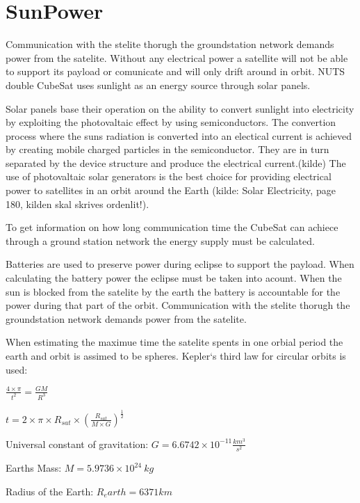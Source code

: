 \section{SunPower}

Communication with the stelite thorugh the groundstation network demands power from the satelite. Without any electrical power a satellite will not be able to support its payload or comunicate and will only drift around in orbit. NUTS double CubeSat uses sunlight as an energy source through solar panels. 

Solar panels base their operation on the ability to convert sunlight into electricity by exploiting the photovaltaic effect by using semiconductors. The convertion process where the suns radiation is converted into an electical current is achieved by creating mobile charged particles in the semiconductor. They are in turn separated by the device structure and produce the electrical current.(kilde) The use of photovaltaic solar generators is the best choice for providing electrical power to satellites in an orbit around the Earth (kilde: Solar Electricity, page 180, kilden skal skrives ordenlit!).

To get information on how long communication time the CubeSat can achiece through a ground station network the energy supply must be calculated.

Batteries are used to preserve power during eclipse to support the payload. When calculating the battery power the eclipse must be taken into acount. When the sun is blocked from the satelite by the earth the battery is accountable for the power during that part of the orbit. Communication with the stelite thorugh the groundstation network demands power from the satelite. 

\vspace{5 mm} When estimating the maximue time the satelite spents in one orbial period the earth and orbit is assimed to be spheres. Kepler`s third law for circular orbits is used:

\vspace{5 mm}$\frac{4\times\pi}{t^2} = \frac{GM}{R^3}$

$t = 2\times\pi\times R_{sat}\times (\frac{R_{sat}}{M\times G})^{\frac{1}{2}}$

\vspace{5 mm}Universal constant of gravitation: $G = 6.6742\times 10^{-11} \frac{km^3}{s^2}$

Earths Mass: $M = 5.9736\times 10^{24}\ kg$

Radius of the Earth: $R_earth = 6371 km$

